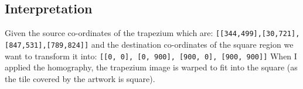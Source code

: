 \documentclass{article}
\begin{document}
\subsection{Interpretation}
Given the source co-ordinates of the trapezium which are:
\newline{}
\texttt{[[344,499],[30,721],[847,531],[789,824]]}
\newline{}
and the destination co-ordinates of the square region we want to transform it into:
\newline{}
\texttt{[[0, 0], [0, 900], [900, 0], [900, 900]]}
When I applied the homography, the trapezium image is warped to fit into the square (as the tile covered by
 the artwork is square).

\end{document}
